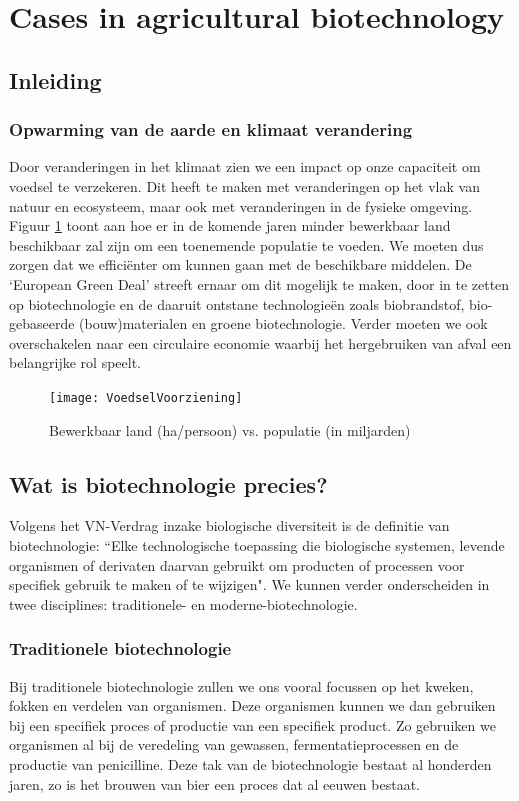 \documentclass[a4paper,kul]{kulakarticle} %
\begin{document}
\section{Cases in agricultural biotechnology}
\subsection{Inleiding}
\subsubsection{Opwarming van de aarde en klimaat verandering}
Door veranderingen in het klimaat zien we een impact op onze capaciteit om voedsel te verzekeren. Dit heeft te maken met veranderingen op het vlak van natuur en ecosysteem, maar ook met veranderingen in de fysieke omgeving. Figuur \ref{fig:voedselvoorziening} toont aan hoe er in de komende jaren minder bewerkbaar land beschikbaar zal zijn om een toenemende populatie te voeden. We moeten dus zorgen dat we efficiënter om kunnen gaan met de beschikbare middelen. De `European Green Deal' streeft ernaar om dit mogelijk te maken, door in te zetten op biotechnologie en de daaruit ontstane technologieën zoals biobrandstof, bio-gebaseerde (bouw)materialen en groene biotechnologie. Verder moeten we ook overschakelen naar een circulaire economie waarbij het hergebruiken van afval een belangrijke rol speelt.
\begin{figure}[h]
	\centering
	\texttt{[image: VoedselVoorziening]}
	\caption[Voedsel voorziening]{Bewerkbaar land (ha/persoon) vs. populatie (in miljarden)}
	\label{fig:voedselvoorziening}
\end{figure}
\subsection{Wat is biotechnologie precies?}
Volgens het VN-Verdrag inzake biologische diversiteit is de definitie van biotechnologie: “Elke technologische toepassing die biologische systemen, levende organismen of derivaten daarvan gebruikt om producten of processen voor specifiek gebruik te maken of te wijzigen". We kunnen verder onderscheiden in twee disciplines: traditionele- en moderne-biotechnologie.  
\subsubsection{Traditionele biotechnologie}
Bij traditionele biotechnologie zullen we ons vooral focussen op het kweken, fokken en verdelen van organismen. Deze organismen kunnen we dan gebruiken bij een specifiek proces of productie van een specifiek product. Zo gebruiken we organismen al bij de veredeling van gewassen, fermentatieprocessen en de productie van penicilline. Deze tak van de biotechnologie bestaat al honderden jaren, zo is het brouwen van bier een proces dat al eeuwen bestaat.
\end{document}
